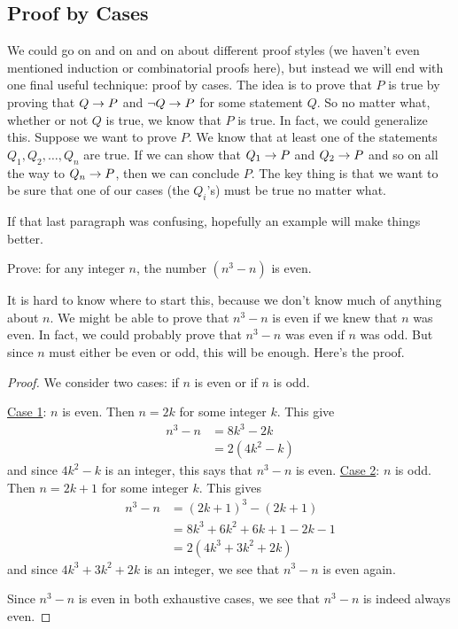 \documentclass[12pt]{article}
\begin{document}
 
 
\subsection*{Proof by Cases}

We could go on and on and on about different proof styles (we haven't even mentioned induction or combinatorial proofs here), but instead we will end with one final useful technique: proof by cases.  The idea is to prove that $P$ is true by proving that $Q \rightarrow P$ and $\neg Q \rightarrow P$ for some statement $Q$.  So no matter what, whether or not $Q$ is true, we know that $P$ is true.  In fact, we could generalize this.  Suppose we want to prove $P$.  We know that at least one of the statements $Q_1, Q_2, \ldots, Q_n$ are true.  If we can show that $Q_1 \rightarrow P$ and $Q_2 \rightarrow P$ and so on all the way to $Q_n \rightarrow P$, then we can conclude $P$.  The key thing is that we want to be sure that one of our cases (the $Q_i$'s) must be true no matter what.

If that last paragraph was confusing, hopefully an example will make things better.

\begin{example}
Prove: for any integer $n$, the number $(n^3 -n)$ is even.

\begin{solution}
It is hard to know where to start this, because we don't know much of anything about $n$.  We might be able to prove that $n^3 - n$ is even if we knew that $n$ was even.  In fact, we could probably prove that $n^3-n$ was even if $n$ was odd.  But since $n$ must either be even or odd, this will be enough.  Here's the proof.

\begin{proof}
We consider two cases: if $n$ is even or if $n$ is odd.

\underline{Case 1}: $n$ is even.  Then $n = 2k$ for some integer $k$.  This give 
\begin{align*}
n^3 - n & = 8k^3 - 2k \\
& = 2(4k^2 - k)
\end{align*}
 and since $4k^2 - k$ is an integer, this says that $n^3-n$ is even.
 \underline{Case 2}: $n$ is odd.  Then $n = 2k+1$ for some integer $k$.  This gives
 \begin{align*}
 n^3 - n & = (2k+1)^3 - (2k+1) \\
 & = 8k^3 + 6k^2 + 6k + 1 - 2k - 1 \\
 & = 2(4k^3 + 3k^2 + 2k)
 \end{align*}
  and since $4k^3 + 3k^2 + 2k$ is an integer, we see that $n^3 - n$ is even again.
  
  Since $n^3 - n$ is even in both exhaustive cases, we see that $n^3 - n$ is indeed always even.
\end{proof}
\end{solution}


\end{example}
\end{document}
